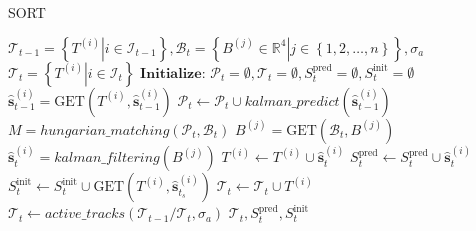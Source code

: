         \begin{algorithm}[t]
            \caption{SORT}
            \label{alg:sort}
            \begin{algorithmic}[1]
                \REQUIRE $\mathcal{T}_{t-1} = \left\{ \left. T^{(i)}\right| i \in \mathcal{I}_{t-1}\right\} , \mathcal{B}_t = \left\{\left. B^{(j)} \in \mathbb{R}^{4}\right| j \in \left\{1,2,\dots,n\right\}\right\},\sigma_a$ 
                \ENSURE $\mathcal{T}_t = \left\{ \left. T^{(i)}\right| i \in \mathcal{I}_{t} \right\}$
                \STATE $\textbf{Initialize: } \mathcal{P}_t = \emptyset,\mathcal{T}_t = \emptyset, S_t^{\text{pred}} = \emptyset, S_t^{\text{init}} = \emptyset$
                    \STATE $\hat{\bm{s}}_{t-1}^{(i)} = \text{GET}(T^{(i)},\hat{\bm{s}}_{t-1}^{(i)})$
                    \STATE $\mathcal{P}_t \leftarrow \mathcal{P}_t \cup kalman\_predict(\hat{\bm{s}}_{t-1}^{(i)})$
                \ENDFOR
                \STATE $M = hungarian\_matching(\mathcal{P}_t, \mathcal{B}_t)$
                    \STATE $B^{(j)} = \text{GET}(\mathcal{B}_t, B^{(j)})$
                    \STATE $\hat{\bm{s}}_t^{(i)} = kalman\_filtering(B^{(j)})$
                    \STATE $T^{(i)} \leftarrow T^{(i)} \cup \hat{\bm{s}}_t^{(i)}$
                    \STATE $S_t^{\text{pred}} \leftarrow S_t^{\text{pred}} \cup \hat{\bm{s}}_t^{(i)}$
                    \STATE $S_t^{\text{init}} \leftarrow S_t^{\text{init}} \cup \text{GET}(T^{(i)}, \hat{\bm{s}}_{t_s}^{(i)})$
                    \STATE $\mathcal{T}_t \leftarrow \mathcal{T}_t \cup T^{(i)}$
                \ENDFOR
                \STATE $\mathcal{T}_t \leftarrow active\_tracks(\mathcal{T}_{t-1} / \mathcal{T}_t, \sigma_a)$
                \RETURN $\mathcal{T}_t, S_t^{\text{pred}}, S_t^{\text{init}}$
            \end{algorithmic}
        \end{algorithm}

